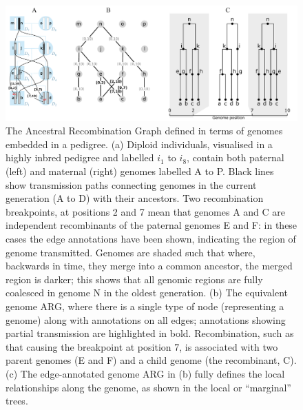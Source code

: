 \documentclass{article}
\begin{document}
\begin{figure}
\begin{center}
    \includegraphics[width=\textwidth]{illustrations/arg-in-pedigree}
\end{center}
\caption{\label{fig-arg-in-pedigree}
The Ancestral Recombination Graph defined in terms of genomes embedded
in a pedigree. (a) Diploid individuals, visualised in a highly inbred pedigree and
labelled $i_1$ to $i_8$, contain both paternal (left) and maternal (right) genomes
labelled \textsf{A} to \textsf{P}. Black lines show transmission paths connecting
genomes in the current generation (\textsf{A} to \textsf{D}) with their ancestors.
Two recombination breakpoints, at positions 2 and 7 mean that genomes \textsf{A}
and \textsf{C} are independent recombinants of the paternal genomes \textsf{E}
and \textsf{F}: in these cases the edge annotations have been shown, indicating the
region of genome transmitted. Genomes are shaded such that where, backwards in time,
they merge into a common ancestor, the merged region is darker; this shows that all
genomic regions are fully coalesced in genome \textsf{N} in the oldest generation.
(b) The equivalent genome ARG, where there is a single type of node (representing
a genome) along with annotations on all edges; annotations showing partial
transmission are highlighted in bold. Recombination, such as that causing the
breakpoint at position 7, is associated with two parent genomes (\textsf{E} and
\textsf{F}) and a child genome (the recombinant, \textsf{C}).
(c) The edge-annotated genome ARG in (b) fully defines the
local relationships along the genome, as shown in the local
or ``marginal'' trees.
}
\end{figure}
\end{document}
